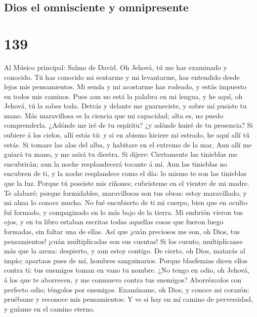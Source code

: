 \hypertarget{dios-el-omnisciente-y-omnipresente}{%
\subsection{Dios el omnisciente y
omnipresente}\label{dios-el-omnisciente-y-omnipresente}}

\hypertarget{section-138}{%
\section{139}\label{section-138}}

 Al Músico principal: Salmo de David. Oh Jehová, tú me has
examinado y conocido.  Tú has conocido mi sentarme y mi
levantarme, has entendido desde lejos mis pensamientos. 
Mi senda y mi acostarme has rodeado, y estás impuesto en todos mis
caminos.  Pues aun no está la palabra en mi lengua, y he
aquí, oh Jehová, tú la sabes toda.  Detrás y delante me
guarneciste, y sobre mí pusiste tu mano.  Más maravillosa
es la ciencia que mi capacidad; alta es, no puedo comprenderla.
 ¿Adónde me iré de tu espíritu? ¿y adónde huiré de tu
presencia?  Si subiere á los cielos, allí estás tú: y si
en abismo hiciere mi estrado, he aquí allí tú estás.  Si
tomare las alas del alba, y habitare en el extremo de la mar,
 Aun allí me guiará tu mano, y me asirá tu diestra.
 Si dijere: Ciertamente las tinieblas me encubrirán; aun
la noche resplandecerá tocante á mí.  Aun las tinieblas
no encubren de ti, y la noche resplandece como el día: lo mismo te son
las tinieblas que la luz.  Porque tú poseiste mis
riñones; cubrísteme en el vientre de mi madre.  Te
alabaré; porque formidables, maravillosas son tus obras: estoy
maravillado, y mi alma lo conoce mucho.  No fué
encubierto de ti mi cuerpo, bien que en oculto fuí formado, y
compaginado en lo más bajo de la tierra.  Mi embrión
vieron tus ojos, y en tu libro estaban escritas todas aquellas cosas que
fueron luego formadas, sin faltar una de ellas.  Así que
¡cuán preciosos me son, oh Dios, tus pensamientos! ¡cuán multiplicadas
son sus cuentas!  Si los cuento, multiplícanse más que la
arena: despierto, y aun estoy contigo.  De cierto, oh
Dios, matarás al impío; apartaos pues de mí, hombres sanguinarios.
 Porque blasfemias dicen ellos contra ti: tus enemigos
toman en vano tu nombre.  ¿No tengo en odio, oh Jehová, á
los que te aborrecen, y me conmuevo contra tus enemigos? 
Aborrézcolos con perfecto odio; téngolos por enemigos. 
Examíname, oh Dios, y conoce mi corazón: pruébame y reconoce mis
pensamientos:  Y ve si hay en mí camino de perversidad, y
guíame en el camino eterno.

